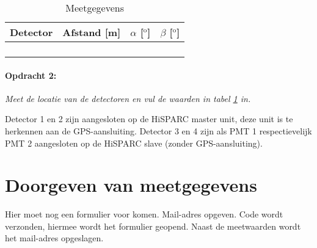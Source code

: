 \begin{table}[h]
\noindent \begin{centering}
\begin{tabular}{|>{\centering}p{3.5cm}|>{\centering}p{3.5cm}|>{\centering}p{3.5cm}|>{\centering}p{3.5cm}|}
\hline 
Detector & Afstand {[}m{]} & $\alpha$ {[}$^{\mathrm{o}}${]} & $\beta$ {[}$^{\mathrm{o}}${]}\tabularnewline
\hline 
\hline 
1 &  &  & \tabularnewline
\hline 
2 &  &  & \tabularnewline
\hline 
3 &  &  & \tabularnewline
\hline 
4 &  &  & \tabularnewline
\hline 
\end{tabular}
\par\end{centering}

\caption{\label{tab:Meetgegevens}Meetgegevens}
\end{table}

\paragraph{Opdracht 2:}

\textit{Meet de locatie van de detectoren en vul de waarden in tabel
\ref{tab:Meetgegevens} in.}

Detector 1 en 2 zijn aangesloten op de HiSPARC master unit, deze unit is te herkennen aan de GPS-aansluiting. Detector 3 en 4 zijn als PMT
1 respectievelijk PMT 2 aangesloten op de HiSPARC slave (zonder GPS-aansluiting).


\section{Doorgeven van meetgegevens}

Hier moet nog een formulier voor komen. Mail-adres opgeven. Code wordt verzonden, hiermee wordt het formulier geopend. Naast de meetwaarden wordt het mail-adres opgeslagen.

